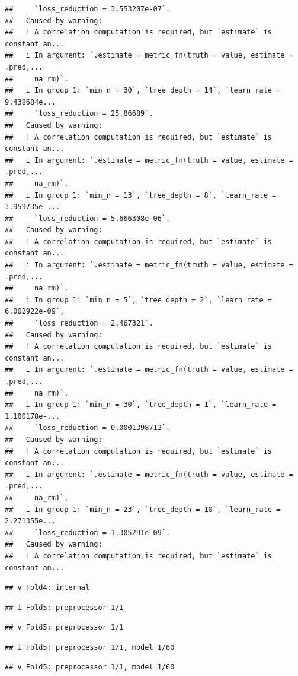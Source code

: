 \documentclass[
]{article}
\begin{document}
\begin{verbatim}
##     `loss_reduction = 3.553207e-07`.
##   Caused by warning:
##   ! A correlation computation is required, but `estimate` is constant an...
##   i In argument: `.estimate = metric_fn(truth = value, estimate = .pred,...
##     na_rm)`.
##   i In group 1: `min_n = 30`, `tree_depth = 14`, `learn_rate = 9.438684e...
##     `loss_reduction = 25.86689`.
##   Caused by warning:
##   ! A correlation computation is required, but `estimate` is constant an...
##   i In argument: `.estimate = metric_fn(truth = value, estimate = .pred,...
##     na_rm)`.
##   i In group 1: `min_n = 13`, `tree_depth = 8`, `learn_rate = 3.959735e-...
##     `loss_reduction = 5.666308e-06`.
##   Caused by warning:
##   ! A correlation computation is required, but `estimate` is constant an...
##   i In argument: `.estimate = metric_fn(truth = value, estimate = .pred,...
##     na_rm)`.
##   i In group 1: `min_n = 5`, `tree_depth = 2`, `learn_rate = 6.002922e-09`,
##     `loss_reduction = 2.467321`.
##   Caused by warning:
##   ! A correlation computation is required, but `estimate` is constant an...
##   i In argument: `.estimate = metric_fn(truth = value, estimate = .pred,...
##     na_rm)`.
##   i In group 1: `min_n = 30`, `tree_depth = 1`, `learn_rate = 1.100178e-...
##     `loss_reduction = 0.0001398712`.
##   Caused by warning:
##   ! A correlation computation is required, but `estimate` is constant an...
##   i In argument: `.estimate = metric_fn(truth = value, estimate = .pred,...
##     na_rm)`.
##   i In group 1: `min_n = 23`, `tree_depth = 10`, `learn_rate = 2.271355e...
##     `loss_reduction = 1.305291e-09`.
##   Caused by warning:
##   ! A correlation computation is required, but `estimate` is constant an...
\end{verbatim}

\begin{verbatim}
## v Fold4: internal
\end{verbatim}

\begin{verbatim}
## i Fold5: preprocessor 1/1
\end{verbatim}

\begin{verbatim}
## v Fold5: preprocessor 1/1
\end{verbatim}

\begin{verbatim}
## i Fold5: preprocessor 1/1, model 1/60
\end{verbatim}

\begin{verbatim}
## v Fold5: preprocessor 1/1, model 1/60
\end{verbatim}
\end{document}
